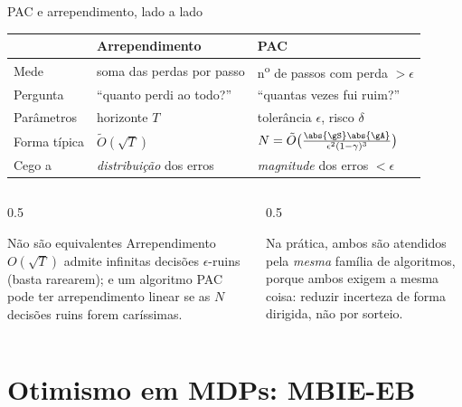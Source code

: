 \documentclass[aspectratio=169, 11pt]{beamer}
\begin{document}
\begin{frame}{PAC e arrependimento, lado a lado}
  \centering
  \small
  \begin{tabular}{@{}l>{\raggedright\arraybackslash}p{}>{\raggedright\arraybackslash}p{}@{}}
    \toprule
    & \textbf{Arrependimento} & \textbf{PAC} \\
    \midrule
    Mede         & soma das perdas por passo & n\textsuperscript{o} de passos com perda $>\epsilon$ \\
    Pergunta     & ``quanto perdi ao todo?'' & ``quantas vezes fui ruim?'' \\
    Parâmetros   & horizonte $T$ & tolerância $\epsilon$, risco $\delta$ \\
    Forma típica & $\tilde{O}(\sqrt{T})$ & $N=\tilde{O}\bigl(\tfrac{\abs{\gS}\abs{\gA}}{\epsilon^{2}(1-\gamma)^{3}}\bigr)$ \\
    Cego a       & \emph{distribuição} dos erros & \emph{magnitude} dos erros $<\epsilon$ \\
    \bottomrule
  \end{tabular}
  \vspace{0.6em}
  \begin{columns}[T]
    \begin{column}{0.5\textwidth}
      \begin{teobox}{Não são equivalentes}
        Arrependimento $O(\sqrt{T})$ admite infinitas decisões $\epsilon$-ruins (basta
        rarearem); e um algoritmo PAC pode ter arrependimento linear se as $N$ decisões
        ruins forem caríssimas.
      \end{teobox}
    \end{column}
    \begin{column}{0.5\textwidth}
      \begin{ideiabox}
        Na prática, ambos são atendidos pela \emph{mesma} família de algoritmos, porque
        ambos exigem a mesma coisa: reduzir incerteza de forma \alert{dirigida}, não
        por sorteio.
      \end{ideiabox}
    \end{column}
  \end{columns}
\end{frame}
\section{Otimismo em MDPs: MBIE-EB}
\end{document}
